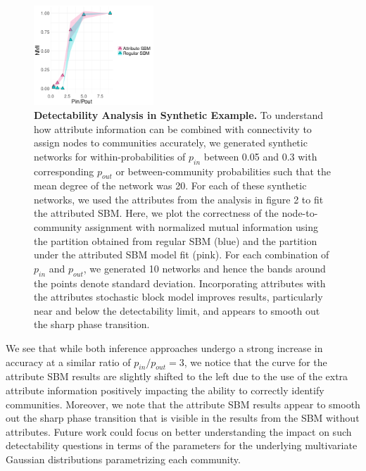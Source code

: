 \documentclass[10pt,journal,compsoc]{IEEEtran}
\begin{document}
\begin{figure}[h!]
\begin{center}
\includegraphics[width=0.4\textwidth]{DetectExp.pdf}
\caption{{\bf Detectability Analysis in Synthetic Example.} To understand how attribute information can be combined with connectivity to assign nodes to communities accurately, we generated synthetic networks for within-probabilities of $p_{in}$ between 0.05 and 0.3 with corresponding $p_{out}$ or between-community probabilities such that the mean degree of the network was 20. For each of these synthetic networks, we used the attributes from the analysis in figure 2 to fit the attributed SBM. Here, we plot the correctness of the node-to-community assignment with normalized mutual information using the partition obtained from regular SBM (blue) and the partition under the attributed SBM model fit (pink). For each combination of $p_{in}$ and $p_{out}$, we generated 10 networks and hence the bands around the points denote standard deviation. Incorporating attributes with the attributes stochastic block model improves results, particularly near and below the detectability limit, and appears to smooth out the sharp phase transition. }
\label{Fig3}
\end{center}
\end{figure}

We see that while both inference approaches undergo a strong increase in accuracy at a similar ratio of $p_{in}/p_{out}=3$, we notice that the curve for the attribute SBM results are slightly shifted to the left due to the use of the extra attribute information positively impacting the ability to correctly identify communities. Moreover, we note that the attribute SBM results appear to smooth out the sharp phase transition that is visible in the results from the SBM without attributes. Future work could focus on better understanding the impact on such detectability questions in terms of the parameters for the underlying multivariate Gaussian distributions parametrizing each community. %
\end{document}
